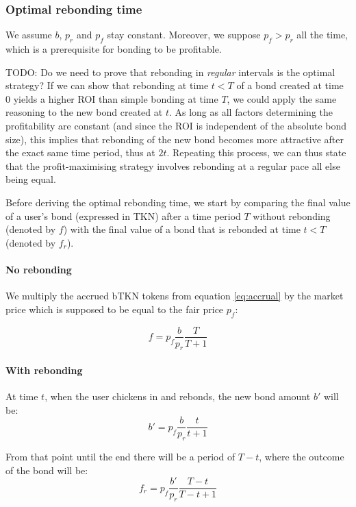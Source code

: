 \documentclass{article}
\begin{document}
\subsubsection{Optimal rebonding time}
We assume $b$, $p_r$ and $p_f$ stay constant. Moreover, we suppose $p_f>p_r$ all the time, which is a prerequisite for bonding to be profitable. 

TODO: Do we need to prove that rebonding in \textit{regular} intervals is the optimal strategy? If we can show that rebonding at time $t<T$ of a bond created at time 0 yields a higher ROI than simple bonding at time $T$, we could apply the same reasoning to the new bond created at $t$. As long as all factors determining the profitability are constant (and since the ROI is independent of the absolute bond size), this implies that rebonding of the new bond becomes more attractive after the exact same time period, thus at $2t$. Repeating this process, we can thus state that the profit-maximising strategy involves rebonding at a regular pace all else being equal.

Before deriving the optimal rebonding time, we start by comparing the final value of a user's bond (expressed in TKN) after a time period $T$ without rebonding (denoted by $f$) with the final value of a bond that is rebonded at time $t<T$ (denoted by $f_r$). 

\paragraph{No rebonding}
We multiply the accrued bTKN tokens from equation \ref{eq:accrual} by the market price which is supposed to be equal to the fair price $p_f$:

\begin{equation}
  \label{eq:o-s}
f = p_f\frac{b}{p_r}\frac{T}{T+1}
\end{equation}

\paragraph{With rebonding}
At time $t$, when the user chickens in and rebonds, the new bond amount $b'$ will be:
\begin{equation}
b'= p_f\frac{b}{p_r}\frac{t}{t+1}
\end{equation}

From that point until the end there will be a period of $T-t$, where the outcome of the bond will be:
\begin{equation}
f_r = p_f\frac{b'}{p_r}\frac{T-t}{T-t+1}
\end{equation}
\end{document}
